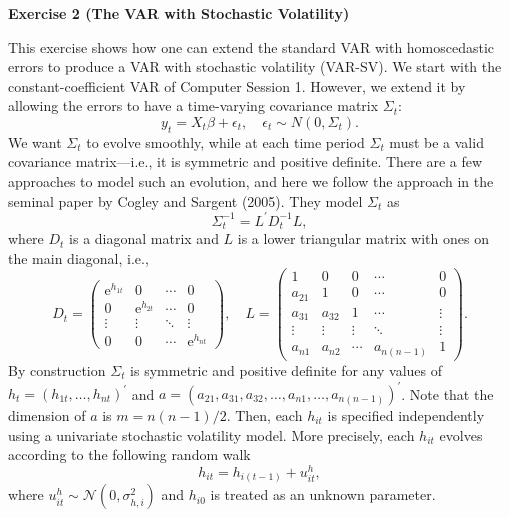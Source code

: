 \documentclass{article}
\begin{document}
\newpage

\textbf{Exercise 2 (The VAR with Stochastic Volatility)}

This exercise shows how one can extend the standard VAR with homoscedastic
errors to produce a VAR with stochastic volatility (VAR-SV). We start with
the constant-coefficient VAR of Computer Session 1. However, we extend it by
allowing the errors to have a time-varying covariance matrix $\Sigma _{t}$: 
\begin{equation}
y_{t}=X_{t}\beta +\epsilon _{t},\quad \epsilon _{t}\sim N(0,\Sigma _{t}).
\label{VAR-SV-y}
\end{equation}%
We want $\Sigma _{t}$ to evolve smoothly, while at each time period $\Sigma
_{t}$ must be a valid covariance matrix---i.e., it is symmetric and positive
definite. There are a few approaches to model such an evolution, and here we
follow the approach in the seminal paper by Cogley and Sargent (2005). They
model $\Sigma _{t}$ as 
\begin{equation*}
\Sigma _{t}^{-1}=L^{\prime }D_{t}^{-1}L,
\end{equation*}%
where $D_{t}$ is a diagonal matrix and $L$ is a lower triangular matrix with
ones on the main diagonal, i.e., 
\begin{equation*}
D_{t}=%
\begin{pmatrix}
\text{e}^{h_{1t}} & 0 & \cdots  & 0 \\ 
0 & \text{e}^{h_{2t}} & \cdots  & 0 \\ 
\vdots  & \vdots  & \ddots  & \vdots  \\ 
0 & 0 & \cdots  & \text{e}^{h_{nt}}%
\end{pmatrix}%
,\quad L=%
\begin{pmatrix}
1 & 0 & 0 & \cdots  & 0 \\ 
a_{21} & 1 & 0 & \cdots  & 0 \\ 
a_{31} & a_{32} & 1 & \cdots  & \vdots  \\ 
\vdots  & \vdots  & \vdots  & \ddots  & \vdots  \\ 
a_{n1} & a_{n2} & \cdots  & a_{n(n-1)} & 1%
\end{pmatrix}%
.
\end{equation*}%
By construction $\Sigma _{t}$ is symmetric and positive definite for any
values of $h_{t}=(h_{1t},\ldots ,h_{nt})^{\prime }$ and $%
a=(a_{21},a_{31},a_{32},\ldots ,a_{n1},\ldots ,a_{n(n-1)})^{\prime }$. Note
that the dimension of $a$ is $m=n(n-1)/2$. Then, each $h_{it}$ is specified
independently using a univariate stochastic volatility model. More
precisely, each $h_{it}$ evolves according to the following random walk 
\begin{equation*}
h_{it}=h_{i(t-1)}+u_{it}^{h},
\end{equation*}%
where $u_{it}^{h}\sim {\mathcal{N}}(0,\sigma _{h,i}^{2})$ and $h_{i0}$ is
treated as an unknown parameter.
\end{document}
